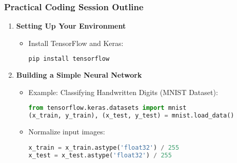 \documentclass{beamer}
\begin{document}
\begin{frame}[fragile]
    \frametitle{Practical Coding Session Outline}
    \begin{enumerate}
        \item \textbf{Setting Up Your Environment}
            \begin{itemize}
                \item Install TensorFlow and Keras:
                \begin{lstlisting}[language=bash]
pip install tensorflow
                \end{lstlisting}
            \end{itemize}

        \item \textbf{Building a Simple Neural Network}
            \begin{itemize}
                \item Example: Classifying Handwritten Digits (MNIST Dataset):
                \begin{lstlisting}[language=python]
from tensorflow.keras.datasets import mnist
(x_train, y_train), (x_test, y_test) = mnist.load_data()
                \end{lstlisting}
                \item Normalize input images:
                \begin{lstlisting}[language=python]
x_train = x_train.astype('float32') / 255
x_test = x_test.astype('float32') / 255
                \end{lstlisting}
            \end{itemize}
    \end{enumerate}
\end{frame}
\end{document}
